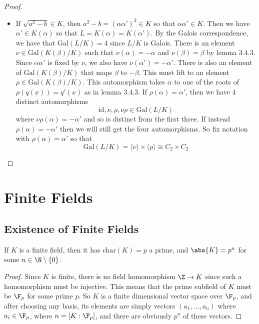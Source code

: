 \documentclass[a4paper]{article}
\begin{document}
\begin{thm}{}{}
\begin{proof}
\begin{itemize}
\item If $\sqrt{a^2-b}\in K$, then $a^2-b=(\alpha\alpha')^2\in K$ so that $\alpha\alpha'\in K$. Then we have $\alpha'\in K(\alpha)$ so that $L=K(\alpha)=K(\alpha')$. By the Galois correspondence, we have that $\text{Gal}(L/K)=4$ since $L/K$ is Galois. There is an element $\nu\in\text{Gal}(K(\beta)/K)$ such that $\nu(\alpha)=-\alpha$ and $\nu(\beta)=\beta$ by lemma 3.4.3. Since $\alpha\alpha'$ is fixed by $\nu$, we also have $\nu(\alpha')=-\alpha'$. There is also an element of $\text{Gal}(K(\beta)/K)$ that maps $\beta$ to $-\beta$. This must lift to an element $\rho\in\text{Gal}(K(\beta)/K)$. This automorphism takes $\alpha$ to one of the roots of $\rho(q(x))=q'(x)$ as in lemma 3.4.3.  If $\rho(\alpha)=\alpha'$, then we have $4$ distinct automorphisms $$\text{id},\nu,\rho,\nu\rho\in\text{Gal}(L/K)$$ where $\nu\rho(\alpha)=-\alpha'$ and so is distinct from the first three. If instead $\rho(\alpha)=-\alpha'$ then we will still get the four automorphisms. So fix notation with $\rho(\alpha)=\alpha'$ so that $$\text{Gal}(L/K)=\langle\nu\rangle\times\langle\rho\rangle\cong C_2\times C_2$$
\end{itemize}
\end{proof}
\end{thm}

\pagebreak
\section{Finite Fields}
\subsection{Existence of Finite Fields}
\begin{prp}{}{} If $K$ is a finite field, then it has $\text{char}(K)=p$ a prime, and $\abs{K}=p^n$ for some $n\in\N\setminus\{0\}$. \tcbline
\begin{proof}
Since $K$ is finite, there is no field homomorphism $\Z\to K$ since such a homomorphism must be injective. This means that the prime subfield of $K$ must be $\F_p$ for some prime $p$. So $K$ is a finite dimensional vector space over $\F_p$, and after choosing any basis, its elements are simply vectors $(a_1,\dots,a_n)$ where $a_i\in\F_p$, where $n=[K:\F_p]$, and there are obviously $p^n$ of these vectors. 
\end{proof}
\end{prp}
\end{document}
